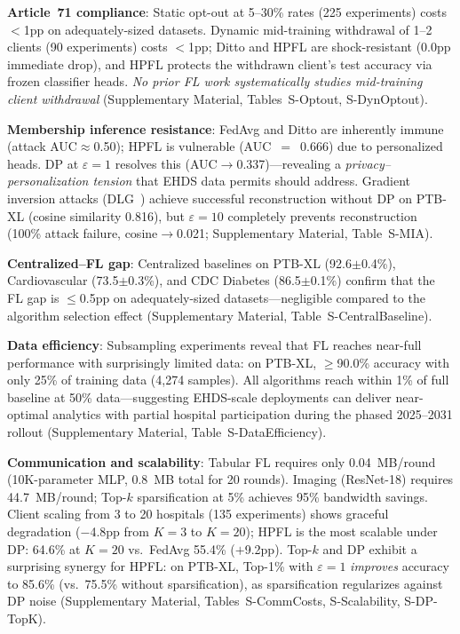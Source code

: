 \documentclass[conference,letterpaper]{IEEEtran}
\begin{document}
\textbf{Article~71 compliance}: Static opt-out at 5--30\% rates (225 experiments) costs $<$1pp on adequately-sized datasets. Dynamic mid-training withdrawal of 1--2 clients (90 experiments) costs $<$1pp; Ditto and HPFL are shock-resistant (0.0pp immediate drop), and HPFL protects the withdrawn client's test accuracy via frozen classifier heads. \textit{No prior FL work systematically studies mid-training client withdrawal} (Supplementary Material, Tables~S-Optout, S-DynOptout).

\textbf{Membership inference resistance}: FedAvg and Ditto are inherently immune (attack AUC$\approx$0.50); HPFL is vulnerable (AUC~$=$~0.666) due to personalized heads. DP at $\varepsilon{=}1$ resolves this (AUC$\to$0.337)---revealing a \textit{privacy--personalization tension} that EHDS data permits should address. Gradient inversion attacks (DLG~\cite{zhu2019deep}) achieve successful reconstruction without DP on PTB-XL (cosine similarity 0.816), but $\varepsilon{=}10$ completely prevents reconstruction (100\% attack failure, cosine$\to$0.021; Supplementary Material, Table~S-MIA).

\textbf{Centralized--FL gap}: Centralized baselines on PTB-XL (92.6$\pm$0.4\%), Cardiovascular (73.5$\pm$0.3\%), and CDC Diabetes (86.5$\pm$0.1\%) confirm that the FL gap is $\leq$0.5pp on adequately-sized datasets---negligible compared to the algorithm selection effect (Supplementary Material, Table~S-CentralBaseline).

\textbf{Data efficiency}: Subsampling experiments reveal that FL reaches near-full performance with surprisingly limited data: on PTB-XL, $\geq$90.0\% accuracy with only 25\% of training data (4,274 samples). All algorithms reach within 1\% of full baseline at 50\% data---suggesting EHDS-scale deployments can deliver near-optimal analytics with partial hospital participation during the phased 2025--2031 rollout (Supplementary Material, Table~S-DataEfficiency).

\textbf{Communication and scalability}: Tabular FL requires only 0.04~MB/round (10K-parameter MLP, 0.8~MB total for 20 rounds). Imaging (ResNet-18) requires 44.7~MB/round; Top-$k$ sparsification at 5\% achieves 95\% bandwidth savings. Client scaling from 3 to 20 hospitals (135 experiments) shows graceful degradation ($-$4.8pp from $K{=}3$ to $K{=}20$); HPFL is the most scalable under DP: 64.6\% at $K{=}20$ vs.\ FedAvg 55.4\% ($+$9.2pp). Top-$k$ and DP exhibit a surprising synergy for HPFL: on PTB-XL, Top-1\% with $\varepsilon{=}1$ \textit{improves} accuracy to 85.6\% (vs.\ 75.5\% without sparsification), as sparsification regularizes against DP noise (Supplementary Material, Tables~S-CommCosts, S-Scalability, S-DP-TopK).
\end{document}

